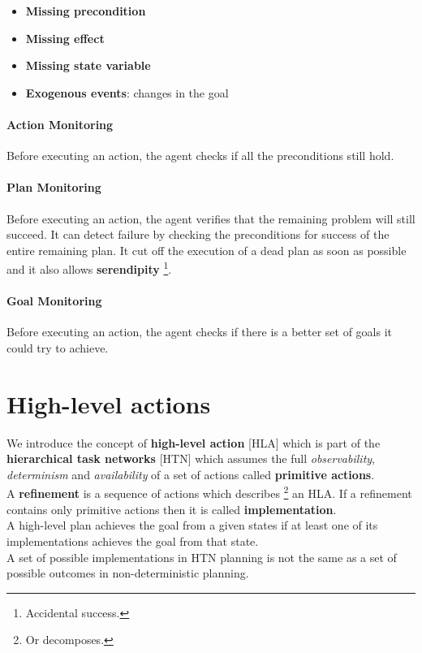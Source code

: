 \documentclass[5pt,a4paper]{article}
\begin{document}
\begin{itemize}
\begin{itemize}
\item \textbf{Missing precondition}
\item \textbf{Missing effect}
\item \textbf{Missing state variable}
\item \textbf{Exogenous events}: changes in the goal
\end{itemize}

\paragraph{Action Monitoring}
Before executing an action, the agent checks if all the preconditions still hold.
\paragraph{Plan Monitoring}
Before executing an action, the agent verifies that the remaining problem will still succeed. It can detect failure by checking the preconditions for success of the entire remaining plan. It cut off the execution of a dead plan as soon as possible and it also allows \textbf{serendipity} \footnote{Accidental success.}. 
\paragraph{Goal Monitoring}
Before executing an action, the agent checks if there is a better set of goals it could try to achieve.

\end{itemize}



\newpage



\newpage

\section{High-level actions}

We introduce the concept of \textbf{high-level action} [HLA] which is part of the \textbf{hierarchical task networks} [HTN] which assumes the full \textit{observability}, \textit{determinism} and \textit{availability} of a set of actions called \textbf{primitive actions}.\\
A \textbf{refinement} is a sequence of actions which describes \footnote{Or decomposes.} an HLA. If a refinement contains only primitive actions then it is called \textbf{implementation}.\\ A high-level plan achieves the goal from a given states if at least one of its implementations achieves the goal from that state.\\A set of possible implementations in HTN planning is not the same as a set of possible outcomes in non-deterministic planning.
\end{document}
